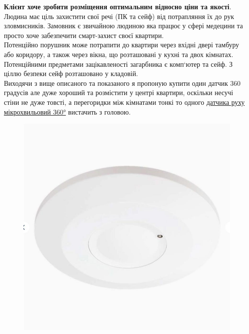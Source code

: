 \textbf{Клієнт хоче зробити розміщення оптимальним відносно ціни та якості}. Людина має ціль захистити свої речі (ПК та сейф) від потрапляння їх до рук зловмисників. Замовник є звичайною людиною яка працює у сфері медецини та просто хоче забезпечити смарт-захист своєї квартири.\\

Потенційно порушник може потрапити до квартири через вхідні двері тамбуру або коридору, а також через вікна, що розташовані у кухні та двох кімнатах.\\

Потенційними предметами зацікавленості загарбника є комп`ютер та сейф. З ціллю безпеки сейф розташовано у кладовій.\\

Виходячи з вище описаного та показаного я пропоную купити один датчик 360 градусів але дуже хороший та розмістити у центрі квартири, оскільки несучі стіни не дуже товсті, а перегоридки між кімнатами тонкі то одного \href{https://www.svit-lamp.ua/datchik-rukhu-mikrokhvilovij-360-230v-bilij/?srsltid=AfmBOorw4jHdgdEdof7Mnl2rhz5X9qELiKz2BF_z3zYOYPQeU4Vz-uxE}{датчика руху мікрохвильовий 360°} вистачить з головою. \\

\begin{figure}[h!]
  \centering
  \includegraphics[width=12cm]{reports/info-protection/lab1/assets/det.jpeg}
\end{figure}

